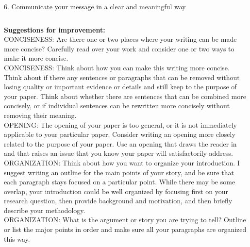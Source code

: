 \documentclass{beamer}
\begin{document}
{\begin{block}{\footnotesize{6. Communicate your message in a clear and meaningful way}}
\begin{tiny}
\begin{columns}
\textbf{Suggestions for improvement:}\\
CONCISENESS: Are there one or two places where your writing can be made more concise?  Carefully read over your work and consider one or two ways to make it more concise.\\ \column{2in}
CONCISENESS:  Think about how you can make this writing more concise.  Think about if there any sentences or paragraphs that can be removed without losing quality or important evidence or details and still keep to the purpose of your paper.  Think about whether there are sentences that can be combined more concisely, or if individual sentences can be rewritten more concisely without removing their meaning.\\
OPENING:  The opening of your paper is too general, or it is not immediately applicable to your particular paper.  Consider writing an opening more closely related to the purpose of your paper.  Use an opening that draws the reader in and that raises an issue that you know your paper will satisfactorily address.\\
ORGANIZATION:  Think about how you want to organize your introduction.  I suggest writing an outline for the main points of your story, and be sure that each paragraph stays focused on a particular point.  While there may be some overlap, your introduction could be well organized by focusing first on your research question, then provide background and motivation, and then briefly describe your methodology.\\
ORGANIZATION:  What is the argument or story you are trying to tell?  Outline or list the major points in order and make sure all your paragraphs are organized this way.\\
  \end{columns}
  \end{tiny}
  \end{block}
}
\end{document}
